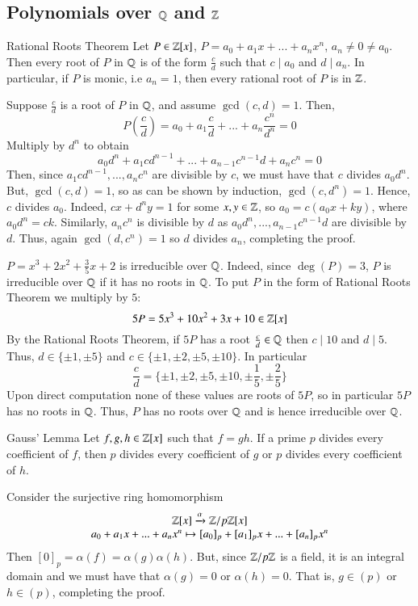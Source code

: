 \documentclass[12pt, a4paper, twoside, openright, titlepage]{book}
\begin{document}
\subsection{\textsection \texorpdfstring{Polynomials over $\mathbb Q$ and $\mathbb Z$}{}}

\begin{namthm}{Rational Roots Theorem}{}
    Let $P \in \mathbb Z[x]$, $P = a_0+a_1x+...+a_nx^n$, $a_n \neq 0 \neq a_0$. Then every root of $P$ in $\mathbb Q$ is of the form $\frac{c}{d}$ such that $c\;\vert\;a_0$ and $d\;\vert\;a_n$. In particular, if $P$ is monic, i.e $a_n = 1$, then every rational root of $P$ is in $\mathbb Z$.
\end{namthm}
\begin{proof*}{}{}
    Suppose $\frac{c}{d}$ is a root of $P$ in $\mathbb Q$, and assume $\gcd(c,d) = 1$. Then, $$P\left(\frac{c}{d}\right) = a_0+a_1\frac{c}{d}+ ... + a_n\frac{c^n}{d^n} = 0$$
    Multiply by $d^n$ to obtain $$a_0d^n+a_1cd^{n-1}+...+a_{n-1}c^{n-1}d+a_nc^n = 0$$
    Then, since $a_1cd^{n-1},...,a_nc^n$ are divisible by $c$, we must have that $c$ divides $a_0d^n$. But, $\gcd(c,d) = 1$, so as can be shown by induction, $\gcd(c,d^n) = 1$. Hence, $c$ divides $a_0$. Indeed, $cx+d^ny = 1$ for some $x,y \in \mathbb Z$, so $a_0 = c(a_0x+ky)$, where $a_0d^n = ck$. Similarly, $a_nc^n$ is divisible by $d$ as $a_0d^n,...,a_{n-1}c^{n-1}d$ are divisible by $d$. Thus, again $\gcd(d,c^n) = 1$ so $d$ divides $a_n$, completing the proof.
\end{proof*}

\begin{eg}{}{}
    $P = x^3+2x^2+\frac{3}{5}x+2$ is irreducible over $\mathbb Q$. Indeed, since $\deg(P) = 3$, $P$ is irreducible over $\mathbb Q$ if it has no roots in $\mathbb Q$. To put $P$ in the form of Rational Roots Theorem we multiply by $5$:
    $$5P = 5x^3+10x^2+3x+10 \in \mathbb Z[x]$$
    By the Rational Roots Theorem, if $5P$ has a root $\frac{c}{d} \in \mathbb Q$ then $c\;\vert\;10$ and $d\;\vert\;5$. Thus, $d \in \{\pm 1,\pm 5\}$ and $c \in \{\pm1,\pm2,\pm5,\pm10\}$. In particular $$\frac{c}{d} = \{\pm1,\pm2,\pm5,\pm10,\pm\frac{1}{5},\pm\frac{2}{5}\}$$
    Upon direct computation none of these values are roots of $5P$, so in particular $5P$ has no roots in $\mathbb Q$. Thus, $P$ has no roots over $\mathbb Q$ and is hence irreducible over $\mathbb Q$.
\end{eg}

\begin{namthm}{Gauss' Lemma}{}
    Let $f,g,h \in \mathbb Z[x]$ such that $f = gh$. If a prime $p$ divides every coefficient of $f$, then $p$ divides every coefficient of $g$ or $p$ divides every coefficient of $h$.
\end{namthm}
\begin{proof*}{}{}
    Consider the surjective ring homomorphism $$\begin{array}{c} \mathbb Z[x]\xrightarrow{\alpha}{\mathbb Z/p\mathbb Z[x]} \\ a_0+a_1x+...+a_nx^n\mapsto [a_0]_p+[a_1]_px+...+[a_n]_px^n \end{array}$$
    Then $[0]_p = \alpha(f) = \alpha(g)\alpha(h)$. But, since $\mathbb Z/p\mathbb Z$ is a field, it is an integral domain and we must have that $\alpha(g) = 0$ or $\alpha(h) = 0$. That is, $g \in (p)$ or $h \in (p)$, completing the proof.
\end{proof*}
\end{document}
